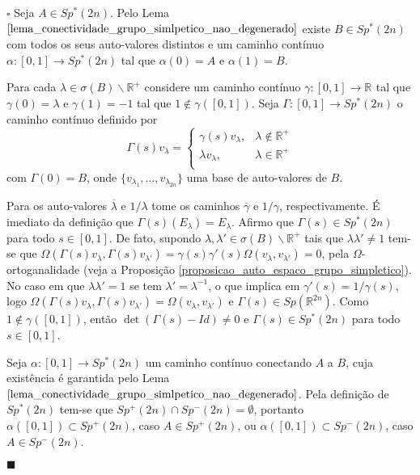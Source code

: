 \documentclass[12pt]{book}
\newenvironment{prova}[1]{$\square$ #1}{\hfill$\blacksquare$}
\newcommand{\complementar}[2]{#1 \backslash #2}
\newcommand{\espectrooperador}[1]{\sigma(#1)}
\newcommand{\formaSimpleticaExtendida}[2]{\Omega(#1, #2)}
\newcommand{\funcaocond}[5]{
	#1 = 
	\left\{
	\begin{array}{cc}
		#2, & #3\\
		#4, & #5\\
	\end{array}
	\right.
}
\newcommand{\gruposimpletico}[1]{Sp(#1)}
\newcommand{\gruposimpleticonaodegenerado}[1]{Sp^{#1}(2n)}
\newcommand{\intervalo}{[0,1]}
\newcommand{\real}[1]{\mathbb{R}^{#1}}
\newcommand{\reta}{\real{}}
\begin{document}
\begin{prova}
		Seja $A \in \gruposimpleticonaodegenerado{*}$. Pelo Lema $\ref{lema_conectividade_grupo_simlpetico_nao_degenerado}$ existe $B \in \gruposimpleticonaodegenerado{*}$ com todos os seus auto-valores distintos  e um caminho contínuo $\alpha:[0,1] \to \gruposimpleticonaodegenerado{*}$ tal que $\alpha(0)=A$ e $\alpha(1) = B$.
		
		Para cada $\lambda \in \complementar{\espectrooperador{B}}{\real{+}}$ considere um caminho contínuo $\gamma:[0,1]\to \reta$ tal que $\gamma(0) = \lambda$ e $\gamma(1) = -1$ tal que $1 \notin \gamma([0,1])$. Seja $\Gamma:[0,1 ]\to \gruposimpleticonaodegenerado{*}$ o caminho contínuo definido por
		$$
		\funcaocond{\Gamma(s)v_{\lambda}}{\gamma(s)v_{\lambda}}{\lambda \notin \real{+}}{\lambda v_{\lambda} }{\lambda \in \real{+}}
		$$
		com $\Gamma(0) = B$, onde $\{v_{\lambda_{1}}, \dots , v_{\lambda_{2n}} \}$ uma base de auto-valores de $B$. 
		
		Para os auto-valores $\overline{\lambda}$ e $1/\lambda$ tome os caminhos $\overline{\gamma}$ e $1/\gamma$, respectivamente. É imediato da definição que $\Gamma(s)(E_{\lambda}) = E_{\lambda}$. Afirmo que $\Gamma(s) \in \gruposimpleticonaodegenerado{*}$ para todo $s\in \intervalo$. De fato, supondo $\lambda,\lambda' \in \complementar{\sigma(B)}{\real{+}}$ tais que $\lambda\lambda' \neq 1$ tem-se que $\formaSimpleticaExtendida{\Gamma(s)v_{\lambda}}{\Gamma(s)v_{\lambda'}}= \gamma(s)\gamma'(s)\formaSimpleticaExtendida{v_{\lambda}}{v_{\lambda'}} = 0$, pela $\Omega$-ortoganalidade (veja a Proposição \ref{proposicao_auto_espaco_grupo_simpletico}). No caso em que $\lambda\lambda'=1$ se tem  $\lambda'=\lambda^{-1}$, o que implica em $\gamma'(s) = 1/\gamma(s)$, logo $\Omega(\Gamma(s)v_{\lambda},\Gamma(s)v_{\lambda'}) = \Omega(v_{\lambda},v_{\lambda'})$ e $\Gamma(s) \in \gruposimpletico{\real{2n}}$. Como $1 \notin \gamma(\intervalo)$, então $\det(\Gamma(s)- Id)\neq 0 $ e $\Gamma(s)\in \gruposimpleticonaodegenerado{*}$ para todo $s\in \intervalo$.
		
		Seja $\alpha:\intervalo\to \gruposimpleticonaodegenerado{*}$ um caminho contínuo conectando $A$ a $B$, cuja existência é garantida pelo Lema $\ref{lema_conectividade_grupo_simlpetico_nao_degenerado}$.
		Pela definição de $\gruposimpleticonaodegenerado{*}$ tem-se que $\gruposimpleticonaodegenerado{+} \cap \gruposimpleticonaodegenerado{-}=\emptyset$, portanto $\alpha([0,1]) \subset \gruposimpleticonaodegenerado{+}$, caso $A \in \gruposimpleticonaodegenerado{+}$, ou $\alpha([0,1]) \subset \gruposimpleticonaodegenerado{-}$, caso $A\in \gruposimpleticonaodegenerado{-}$.
		

\end{prova}
\end{document}
